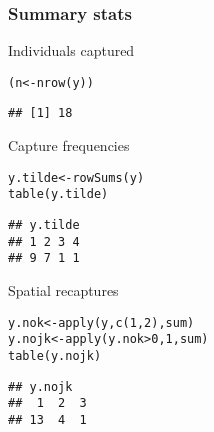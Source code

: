 \documentclass[color=usenames,dvipsnames]{beamer}\usepackage[]{graphicx}\usepackage[]{xcolor}
\makeatletter
\newcommand{\hlnum}[1]{\textcolor[rgb]{0.69,0.494,0}{#1}}%
\newcommand{\hlopt}[1]{\textcolor[rgb]{0,0,0}{#1}}%
\newcommand{\hldef}[1]{\textcolor[rgb]{0,0,0}{#1}}%
\newcommand{\hlkwb}[1]{\textcolor[rgb]{0,0.341,0.682}{#1}}%
\newcommand{\hlkwd}[1]{\textcolor[rgb]{0.004,0.004,0.506}{#1}}%
\newenvironment{kframe}{%
 \def\at@end@of@kframe{}%
 \ifinner\ifhmode%
  \def\at@end@of@kframe{\end{minipage}}%
  \begin{minipage}{\columnwidth}%
 \fi\fi%
 \def\FrameCommand##1{\hskip\@totalleftmargin \hskip-\fboxsep
 \colorbox{shadecolor}{##1}\hskip-\fboxsep
     \hskip-\linewidth \hskip-\@totalleftmargin \hskip\columnwidth}%
 \MakeFramed {\advance\hsize-\width
   \@totalleftmargin\z@ \linewidth\hsize
   \@setminipage}}%
 {\par\unskip\endMakeFramed%
 \at@end@of@kframe}
\newenvironment{knitrout}{}{} %
\makeatother
\begin{document}
\begin{frame}[fragile]
  \frametitle{Summary stats}
  \small
  Individuals captured
\begin{knitrout}\footnotesize
{}\color{fgcolor}\begin{kframe}
\begin{alltt}
\hldef{(n} \hlkwb{<-} \hlkwd{nrow}\hldef{(y))}
\end{alltt}
\begin{verbatim}
## [1] 18
\end{verbatim}
\end{kframe}
\end{knitrout}
\pause \vfill
  Capture frequencies
  \vspace{-6pt}  
\begin{knitrout}\footnotesize
{}\color{fgcolor}\begin{kframe}
\begin{alltt}
\hldef{y.tilde} \hlkwb{<-} \hlkwd{rowSums}\hldef{(y)}
\hlkwd{table}\hldef{(y.tilde)}
\end{alltt}
\begin{verbatim}
## y.tilde
## 1 2 3 4 
## 9 7 1 1
\end{verbatim}
\end{kframe}
\end{knitrout}
\pause
\vfill
Spatial recaptures
  \vspace{-6pt}  
\begin{knitrout}\footnotesize
{}\color{fgcolor}\begin{kframe}
\begin{alltt}
\hldef{y.nok} \hlkwb{<-} \hlkwd{apply}\hldef{(y,} \hlkwd{c}\hldef{(}\hlnum{1}\hldef{,} \hlnum{2}\hldef{), sum)}
\hldef{y.nojk} \hlkwb{<-} \hlkwd{apply}\hldef{(y.nok}\hlopt{>}\hlnum{0}\hldef{,} \hlnum{1}\hldef{, sum)}
\hlkwd{table}\hldef{(y.nojk)}
\end{alltt}
\begin{verbatim}
## y.nojk
##  1  2  3 
## 13  4  1
\end{verbatim}
\end{kframe}
\end{knitrout}
\end{frame}
\end{document}
